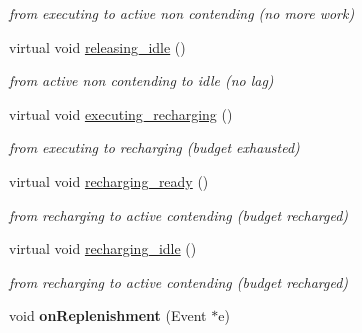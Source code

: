 \begin{DoxyCompactItemize}
\begin{DoxyCompactList}\small\item\em from executing to active non contending (no more work) \end{DoxyCompactList}\item 
virtual void \hyperlink{classRTSim_1_1SporadicServer_ab91b884ac4598cba074c55eda0cba949}{releasing\+\_\+idle} ()\hypertarget{classRTSim_1_1SporadicServer_ab91b884ac4598cba074c55eda0cba949}{}\label{classRTSim_1_1SporadicServer_ab91b884ac4598cba074c55eda0cba949}

\begin{DoxyCompactList}\small\item\em from active non contending to idle (no lag) \end{DoxyCompactList}\item 
virtual void \hyperlink{classRTSim_1_1SporadicServer_a926bb1c9c5bad3baf7f83a4aa8fc893b}{executing\+\_\+recharging} ()\hypertarget{classRTSim_1_1SporadicServer_a926bb1c9c5bad3baf7f83a4aa8fc893b}{}\label{classRTSim_1_1SporadicServer_a926bb1c9c5bad3baf7f83a4aa8fc893b}

\begin{DoxyCompactList}\small\item\em from executing to recharging (budget exhausted) \end{DoxyCompactList}\item 
virtual void \hyperlink{classRTSim_1_1SporadicServer_a0732ce20697cd1327ad5f65bd7f2bdac}{recharging\+\_\+ready} ()\hypertarget{classRTSim_1_1SporadicServer_a0732ce20697cd1327ad5f65bd7f2bdac}{}\label{classRTSim_1_1SporadicServer_a0732ce20697cd1327ad5f65bd7f2bdac}

\begin{DoxyCompactList}\small\item\em from recharging to active contending (budget recharged) \end{DoxyCompactList}\item 
virtual void \hyperlink{classRTSim_1_1SporadicServer_a09bc8c315a1d34ba84727e3c390bbd65}{recharging\+\_\+idle} ()\hypertarget{classRTSim_1_1SporadicServer_a09bc8c315a1d34ba84727e3c390bbd65}{}\label{classRTSim_1_1SporadicServer_a09bc8c315a1d34ba84727e3c390bbd65}

\begin{DoxyCompactList}\small\item\em from recharging to active contending (budget recharged) \end{DoxyCompactList}\item 
void {\bfseries on\+Replenishment} (Event $\ast$e)\hypertarget{classRTSim_1_1SporadicServer_a1ef29c4bc5cc49d6f0af19001e454003}{}\label{classRTSim_1_1SporadicServer_a1ef29c4bc5cc49d6f0af19001e454003}


\end{DoxyCompactItemize}
